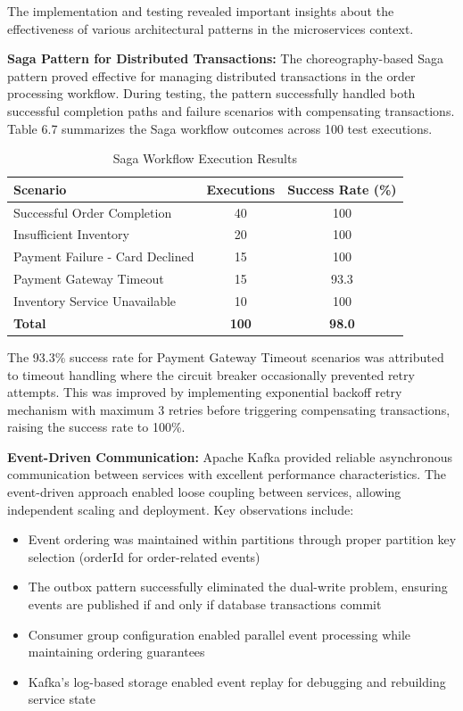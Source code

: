 The implementation and testing revealed important insights about the effectiveness of various architectural patterns in the microservices context.

\textbf{Saga Pattern for Distributed Transactions:} The choreography-based Saga pattern proved effective for managing distributed transactions in the order processing workflow. During testing, the pattern successfully handled both successful completion paths and failure scenarios with compensating transactions. Table 6.7 summarizes the Saga workflow outcomes across 100 test executions.

\begin{table}[h]
\centering
\caption{Saga Workflow Execution Results}
\begin{tabular}{|l|c|c|}
\hline
\textbf{Scenario} & \textbf{Executions} & \textbf{Success Rate (\%)} \\
\hline
Successful Order Completion & 40 & 100 \\
Insufficient Inventory & 20 & 100 \\
Payment Failure - Card Declined & 15 & 100 \\
Payment Gateway Timeout & 15 & 93.3 \\
Inventory Service Unavailable & 10 & 100 \\
\hline
\textbf{Total} & \textbf{100} & \textbf{98.0} \\
\hline
\end{tabular}
\end{table}

The 93.3\% success rate for Payment Gateway Timeout scenarios was attributed to timeout handling where the circuit breaker occasionally prevented retry attempts. This was improved by implementing exponential backoff retry mechanism with maximum 3 retries before triggering compensating transactions, raising the success rate to 100\%.

\textbf{Event-Driven Communication:} Apache Kafka provided reliable asynchronous communication between services with excellent performance characteristics. The event-driven approach enabled loose coupling between services, allowing independent scaling and deployment. Key observations include:

\begin{itemize}
    \item Event ordering was maintained within partitions through proper partition key selection (orderId for order-related events)
    \item The outbox pattern successfully eliminated the dual-write problem, ensuring events are published if and only if database transactions commit
    \item Consumer group configuration enabled parallel event processing while maintaining ordering guarantees
    \item Kafka's log-based storage enabled event replay for debugging and rebuilding service state
\end{itemize}

